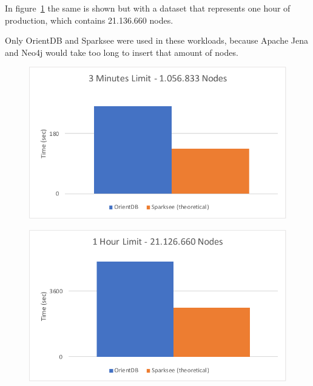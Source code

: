 In figure~\ref{fig:hourSuitability} the same is shown but with a dataset that represents one hour of production,
which contains 21.136.660 nodes.

Only OrientDB and Sparksee were used in these workloads,
because Apache Jena and Neo4j would take too long to insert that amount of nodes.

\begin{figure}[h!]
  \begin{minipage}{.5\textwidth}
    \centering
    \includegraphics[width=\textwidth]{images/production/singleSuitability}
    \label{fig:singleSuitability}
  \end{minipage}
  \begin{minipage}{.5\textwidth}
    \centering
    \includegraphics[width=\textwidth]{images/production/hourSuitability}
    \label{fig:hourSuitability}
  \end{minipage}
\end{figure}

